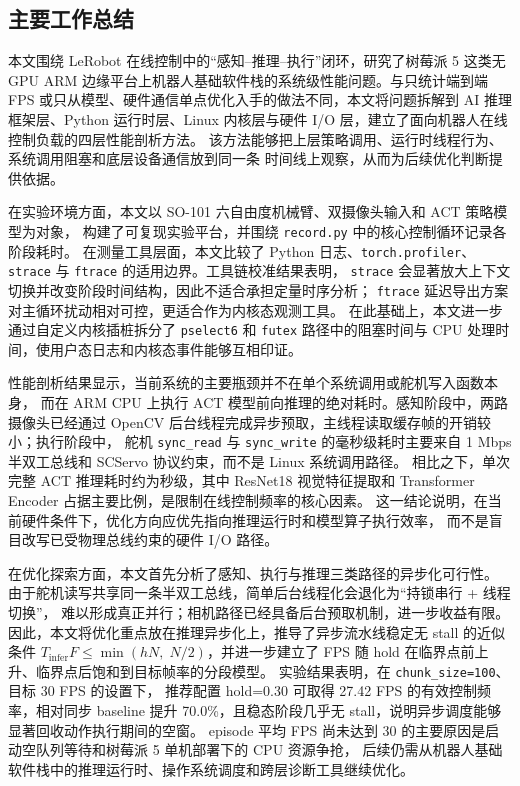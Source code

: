\subsection{主要工作总结}

本文围绕 LeRobot 在线控制中的``感知--推理--执行''闭环，研究了树莓派 5
这类无 GPU ARM 边缘平台上机器人基础软件栈的系统级性能问题。与只统计端到端
FPS 或只从模型、硬件通信单点优化入手的做法不同，本文将问题拆解到 AI 推理框架层、Python 运行时层、Linux
内核层与硬件 I/O 层，建立了面向机器人在线控制负载的四层性能剖析方法。
该方法能够把上层策略调用、运行时线程行为、系统调用阻塞和底层设备通信放到同一条
时间线上观察，从而为后续优化判断提供依据。

在实验环境方面，本文以 SO-101 六自由度机械臂、双摄像头输入和 ACT 策略模型为对象，
构建了可复现实验平台，并围绕 \texttt{record.py} 中的核心控制循环记录各阶段耗时。
在测量工具层面，本文比较了 Python 日志、\texttt{torch.profiler}、
\texttt{strace} 与 \texttt{ftrace} 的适用边界。工具链校准结果表明，
\texttt{strace} 会显著放大上下文切换并改变阶段时间结构，因此不适合承担定量时序分析；
\texttt{ftrace} 延迟导出方案对主循环扰动相对可控，更适合作为内核态观测工具。
在此基础上，本文进一步通过自定义内核插桩拆分了 \texttt{pselect6} 和
\texttt{futex} 路径中的阻塞时间与 CPU 处理时间，使用户态日志和内核态事件能够互相印证。

性能剖析结果显示，当前系统的主要瓶颈并不在单个系统调用或舵机写入函数本身，
而在 ARM CPU 上执行 ACT 模型前向推理的绝对耗时。感知阶段中，两路摄像头已经通过
OpenCV 后台线程完成异步预取，主线程读取缓存帧的开销较小；执行阶段中，
舵机 \texttt{sync\_read} 与 \texttt{sync\_write} 的毫秒级耗时主要来自
1 Mbps 半双工总线和 SCServo 协议约束，而不是 Linux 系统调用路径。
相比之下，单次完整 ACT 推理耗时约为秒级，其中 ResNet18 视觉特征提取和
Transformer Encoder 占据主要比例，是限制在线控制频率的核心因素。
这一结论说明，在当前硬件条件下，优化方向应优先指向推理运行时和模型算子执行效率，
而不是盲目改写已受物理总线约束的硬件 I/O 路径。

在优化探索方面，本文首先分析了感知、执行与推理三类路径的异步化可行性。
由于舵机读写共享同一条半双工总线，简单后台线程化会退化为``持锁串行 + 线程切换''，
难以形成真正并行；相机路径已经具备后台预取机制，进一步收益有限。
因此，本文将优化重点放在推理异步化上，推导了异步流水线稳定无 stall 的近似条件
\(T_{\text{infer}}F \leq \min(hN,\;N/2)\)，并进一步建立了
FPS 随 hold 在临界点前上升、临界点后饱和到目标帧率的分段模型。
实验结果表明，在 \texttt{chunk\_size=100}、目标 30 FPS 的设置下，
推荐配置 hold=0.30 可取得 27.42 FPS 的有效控制频率，相对同步 baseline
提升 70.0\%，且稳态阶段几乎无 stall，说明异步调度能够显著回收动作执行期间的空窗。
episode 平均 FPS 尚未达到 30 的主要原因是启动空队列等待和树莓派 5 单机部署下的 CPU 资源争抢，
后续仍需从机器人基础软件栈中的推理运行时、操作系统调度和跨层诊断工具继续优化。

